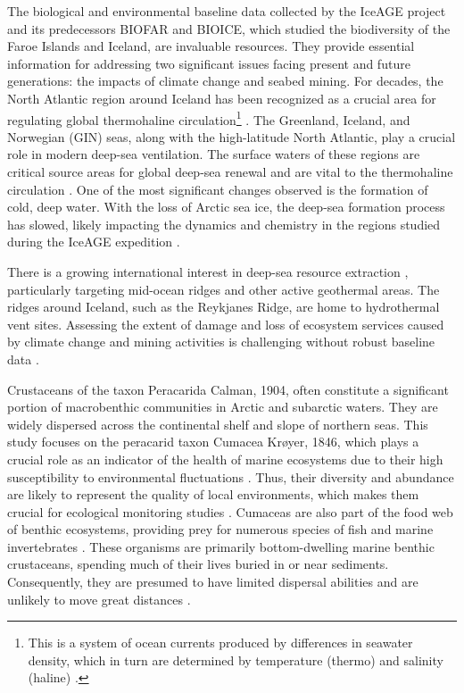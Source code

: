 The biological and environmental baseline data collected by the IceAGE project and its predecessors BIOFAR and BIOICE, which studied the biodiversity of the Faroe Islands and Iceland, are invaluable resources. They provide essential information for addressing two significant issues facing present and future generations: the impacts of climate change and seabed mining. For decades, the North Atlantic region around Iceland has been recognized as a crucial area for regulating global {thermohaline circulation}\footnote{This is a system of ocean currents produced by differences in seawater density, which in turn are determined by temperature (thermo) and salinity (haline) \citep{talley2013closure}.} \citep{meisner_prefacebiodiversity_2018}. The Greenland, Iceland, and Norwegian (GIN) seas, along with the high-latitude North Atlantic, play a crucial role in modern deep-sea ventilation. The surface waters of these regions are critical source areas for global deep-sea renewal and are vital to the thermohaline circulation \citep{johannessen_relationship_1994}. One of the most significant changes observed is the formation of cold, deep water. With the loss of Arctic sea ice, the deep-sea formation process has slowed, likely impacting the dynamics and chemistry in the regions studied during the IceAGE expedition \citep{meisner_prefacebiodiversity_2018}.

There is a growing international interest in deep-sea resource extraction \citep{mengerink_call_2014}, particularly targeting mid-ocean ridges and other active geothermal areas. The ridges around Iceland, such as the Reykjanes Ridge, are home to hydrothermal vent sites. Assessing the extent of damage and loss of ecosystem services caused by climate change and mining activities is challenging without robust baseline data \citep{meisner_prefacebiodiversity_2018}.

Crustaceans of the taxon Peracarida Calman, 1904, often constitute a significant portion of macrobenthic communities in Arctic and subarctic waters. They are widely dispersed across the continental shelf and slope of northern seas. This study focuses on the peracarid taxon Cumacea Krøyer, 1846, which plays a crucial role as an indicator of the health of marine ecosystems due to their high susceptibility to environmental fluctuations \citep{stransky_diversity_2010}. Thus, their diversity and abundance are likely to represent the quality of local environments, which makes them crucial for ecological monitoring studies \citep{hessler1967faunal}. Cumaceas are also part of the food web of benthic ecosystems, providing prey for numerous species of fish and marine invertebrates \citep{rehm2009cumacea}. These organisms are primarily bottom-dwelling marine benthic crustaceans, spending much of their lives buried in or near sediments. Consequently, they are presumed to have limited dispersal abilities and are unlikely to move great distances \citep{uhlir_adding_2021}.

